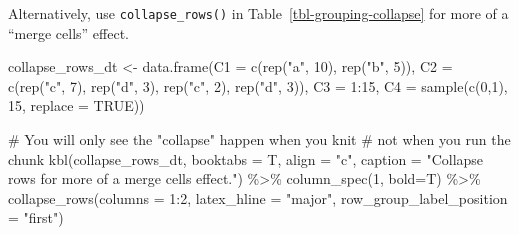 \documentclass[
  letterpaper,
  DIV=11,
  numbers=noendperiod]{scrartcl}
\newenvironment{Shaded}{\begin{snugshade}}{\end{snugshade}}
\newcommand{\AttributeTok}[1]{\textcolor[rgb]{0.40,0.45,0.13}{#1}}
\newcommand{\CommentTok}[1]{\textcolor[rgb]{0.37,0.37,0.37}{#1}}
\newcommand{\ConstantTok}[1]{\textcolor[rgb]{0.56,0.35,0.01}{#1}}
\newcommand{\DecValTok}[1]{\textcolor[rgb]{0.68,0.00,0.00}{#1}}
\newcommand{\FunctionTok}[1]{\textcolor[rgb]{0.28,0.35,0.67}{#1}}
\newcommand{\NormalTok}[1]{\textcolor[rgb]{0.00,0.23,0.31}{#1}}
\newcommand{\OtherTok}[1]{\textcolor[rgb]{0.00,0.23,0.31}{#1}}
\newcommand{\SpecialCharTok}[1]{\textcolor[rgb]{0.37,0.37,0.37}{#1}}
\newcommand{\StringTok}[1]{\textcolor[rgb]{0.13,0.47,0.30}{#1}}
\begin{document}
Alternatively, use \texttt{collapse\_rows()} in
Table~\ref{tbl-grouping-collapse} for more of a ``merge cells'' effect.

\begin{Shaded}
\begin{Highlighting}[]
\NormalTok{collapse\_rows\_dt }\OtherTok{\textless{}{-}} \FunctionTok{data.frame}\NormalTok{(}\AttributeTok{C1 =} \FunctionTok{c}\NormalTok{(}\FunctionTok{rep}\NormalTok{(}\StringTok{"a"}\NormalTok{, }\DecValTok{10}\NormalTok{), }\FunctionTok{rep}\NormalTok{(}\StringTok{"b"}\NormalTok{, }\DecValTok{5}\NormalTok{)),}
                               \AttributeTok{C2 =} \FunctionTok{c}\NormalTok{(}\FunctionTok{rep}\NormalTok{(}\StringTok{"c"}\NormalTok{, }\DecValTok{7}\NormalTok{), }\FunctionTok{rep}\NormalTok{(}\StringTok{"d"}\NormalTok{, }\DecValTok{3}\NormalTok{), }\FunctionTok{rep}\NormalTok{(}\StringTok{"c"}\NormalTok{, }\DecValTok{2}\NormalTok{), }\FunctionTok{rep}\NormalTok{(}\StringTok{"d"}\NormalTok{, }\DecValTok{3}\NormalTok{)),}
                               \AttributeTok{C3 =} \DecValTok{1}\SpecialCharTok{:}\DecValTok{15}\NormalTok{,}
                               \AttributeTok{C4 =} \FunctionTok{sample}\NormalTok{(}\FunctionTok{c}\NormalTok{(}\DecValTok{0}\NormalTok{,}\DecValTok{1}\NormalTok{), }\DecValTok{15}\NormalTok{, }\AttributeTok{replace =} \ConstantTok{TRUE}\NormalTok{))}

\CommentTok{\# You will only see the "collapse" happen when you knit}
\CommentTok{\# not when you run the chunk}
\FunctionTok{kbl}\NormalTok{(collapse\_rows\_dt, }\AttributeTok{booktabs =}\NormalTok{ T, }\AttributeTok{align =} \StringTok{"c"}\NormalTok{,}
    \AttributeTok{caption =} \StringTok{"Collapse rows for more of a \textquotesingle{}merge cells\textquotesingle{} effect."}\NormalTok{) }\SpecialCharTok{\%\textgreater{}\%}
  \FunctionTok{column\_spec}\NormalTok{(}\DecValTok{1}\NormalTok{, }\AttributeTok{bold=}\NormalTok{T) }\SpecialCharTok{\%\textgreater{}\%}
  \FunctionTok{collapse\_rows}\NormalTok{(}\AttributeTok{columns =} \DecValTok{1}\SpecialCharTok{:}\DecValTok{2}\NormalTok{,}
                \AttributeTok{latex\_hline =} \StringTok{"major"}\NormalTok{,}
                \AttributeTok{row\_group\_label\_position =} \StringTok{"first"}\NormalTok{)}
\end{Highlighting}
\end{Shaded}
\end{document}
